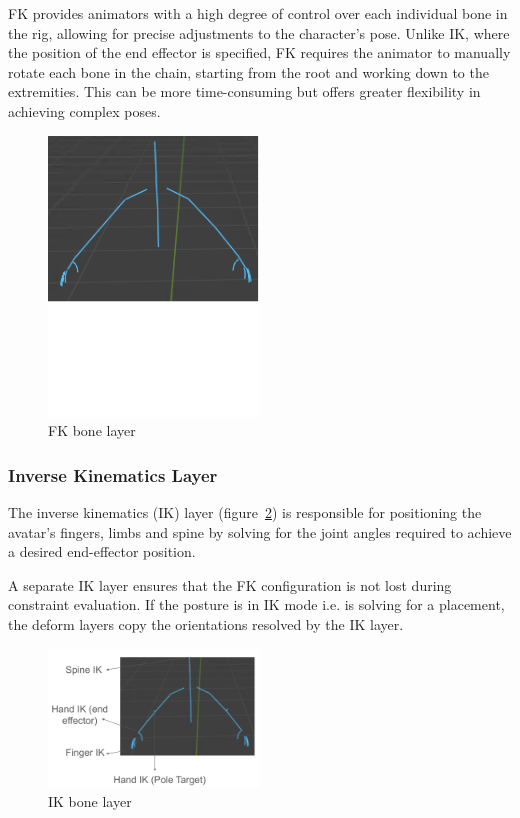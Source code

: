 \documentclass[../../main.tex]{subfiles}
\begin{document}
FK provides animators with a high degree of control over each individual bone in the rig, allowing for precise adjustments to the character's pose. Unlike IK, where the position of the end effector is specified, FK requires the animator to manually rotate each bone in the chain, starting from the root and working down to the extremities. This can be more time-consuming but offers greater flexibility in achieving complex poses.

\begin{figure}
    \centering
    \includegraphics[width=0.5\textwidth]{chapters/avatar_creation_pose_synthesis/images/fk_layer.png}
    \caption{FK bone layer}
    \label{fig:fk_layer}
\end{figure}

\subsubsection{Inverse Kinematics Layer}
\label{ch:avatar_creation_pose_synthesis:proc_rig_signing_avatars:bone_layers:ik_layer}

The inverse kinematics (IK) layer (figure~\ref{fig:ik_layer}) is responsible for positioning the avatar's fingers, limbs and spine by solving for the joint angles required to achieve a desired end-effector position.

A separate IK layer ensures that the FK configuration is not lost during constraint evaluation. If the posture is in IK mode i.e. is solving for a placement, the deform layers copy the orientations resolved by the IK layer.

\begin{figure}
    \centering
    \includegraphics[width=0.5\textwidth]{chapters/avatar_creation_pose_synthesis/images/ik_layer.png}
    \caption{IK bone layer}
    \label{fig:ik_layer}
\end{figure}
\end{document}
